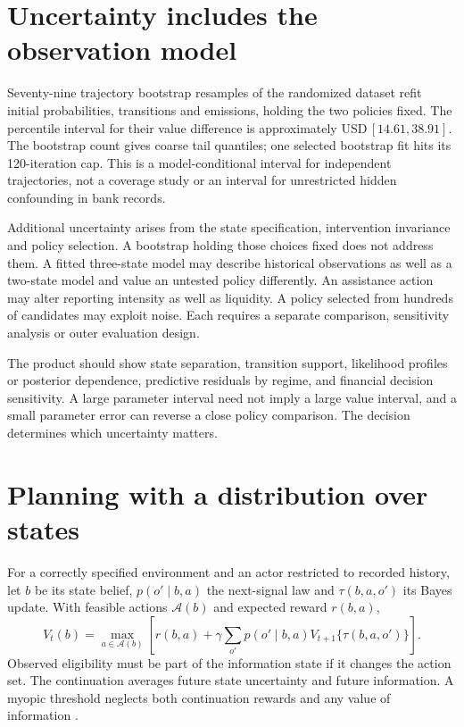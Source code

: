 \section{Uncertainty includes the observation model}
Seventy-nine trajectory bootstrap resamples of the randomized dataset
refit initial probabilities, transitions and emissions, holding the two
policies fixed. The percentile interval for their value difference is
approximately USD\,$[14.61,38.91]$. The bootstrap count gives coarse
tail quantiles; one selected bootstrap fit hits its 120-iteration cap.
This is a model-conditional interval for independent
trajectories, not a coverage study or an interval for unrestricted hidden
confounding in bank records.

Additional uncertainty arises from the state specification, intervention
invariance and policy selection. A bootstrap holding those choices fixed
does not address them. A fitted three-state model may describe historical
observations as well as a two-state model and value an untested policy
differently. An assistance action may alter reporting intensity as well
as liquidity. A policy selected from hundreds of candidates may exploit
noise. Each requires a separate comparison, sensitivity analysis or outer
evaluation design.

The product should show state separation, transition support, likelihood
profiles or posterior dependence, predictive residuals by regime, and
financial decision sensitivity. A large parameter interval need not imply
a large value interval, and a small parameter error can reverse a close
policy comparison. The decision determines which uncertainty matters.

\section{Planning with a distribution over states}
For a correctly specified environment and an actor restricted to recorded
history, let $b$ be its state belief, $p(o'\mid b,a)$ the next-signal
law and $\tau(b,a,o')$ its Bayes update. With feasible actions
$\mathcal A(b)$ and expected reward $r(b,a)$,
\begin{equation}
 V_t(b)=\max_{a\in\mathcal A(b)}\left[
 r(b,a)+\gamma\sum_{o'}p(o'\mid b,a)
       V_{t+1}\{\tau(b,a,o')\}\right].
 \label{eq:belief-bellman}
\end{equation}
Observed eligibility must be part of the information state if it changes
the action set. The continuation averages future state uncertainty and
future information. A myopic threshold neglects both continuation rewards
and any value of information \citep{kaelbling1998}.


